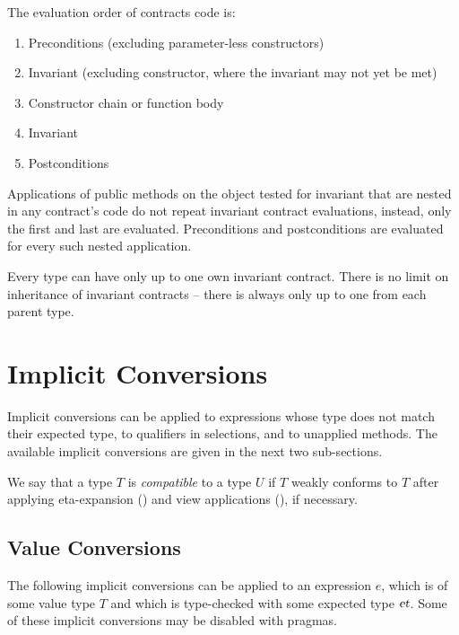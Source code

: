 The evaluation order of contracts code is:
\begin{enumerate}
  \item Preconditions (excluding parameter-less constructors)
  \item Invariant (excluding constructor, where the invariant may not yet be met)
  \item Constructor chain or function body
  \item Invariant
  \item Postconditions
\end{enumerate}

Applications of public methods on the object tested for invariant that are nested in any contract's code do not repeat invariant contract evaluations, instead, only the first and last are evaluated. Preconditions and postconditions are evaluated for every such nested application. 

Every type can have only up to one own invariant contract. There is no limit on inheritance of invariant contracts -- there is always only up to one from each parent type. 





\section{Implicit Conversions}
\label{sec:implicit-conversions}

Implicit conversions can be applied to expressions whose type does not match their expected type, to qualifiers in selections, and to unapplied methods. The available implicit conversions are given in the next two sub-sections.

We say that a type $T$ is {\em compatible} to a type $U$ if $T$ weakly conforms to $T$ after applying eta-expansion () and view applications (), if necessary.






\subsection{Value Conversions}
\label{sec:value-conversions}

The following implicit conversions can be applied to an expression $e$, which is of some value type $T$ and which is type-checked with some expected type $\mbox{\sl et}$. Some of these implicit conversions may be disabled with pragmas.

